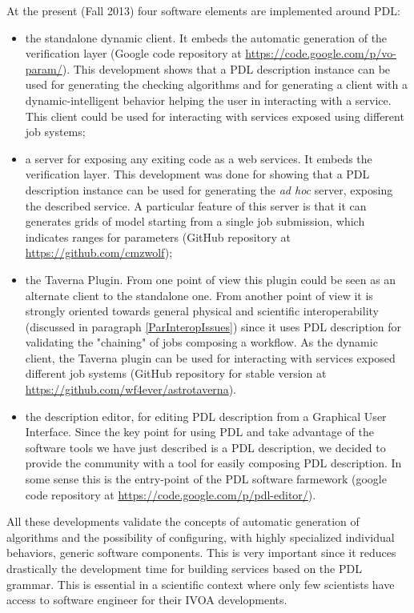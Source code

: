 \documentclass[a4paper,11pt] {ivoa}
\begin{document}
At the present (Fall 2013) four software elements are implemented around PDL:
\begin{itemize}
\item the standalone dynamic client. It embeds the automatic generation of the verification layer (Google code repository at \url{https://code.google.com/p/vo-param/}). This development shows that a PDL description instance can be used for generating the checking algorithms and for generating a client with a dynamic-intelligent behavior helping the user in interacting with a service. This client could be used for interacting with services exposed using different job systems;
\item a server for exposing any exiting code as a web services. It embeds the verification layer. This development was done for showing that a PDL description instance can be used for generating the {\it ad hoc} server, exposing the described service. A particular feature of this server is that it can generates grids of model starting from a single job submission, which indicates ranges for parameters (GitHub repository at \url{https://github.com/cmzwolf});
\item the Taverna Plugin. From one point of view this plugin could be seen as an alternate client to the standalone one. From another point of view it is strongly oriented towards general physical and scientific interoperability (discussed in paragraph \ref{ParInteropIssues}) since it uses PDL description for validating the "chaining" of jobs composing a workflow. As the dynamic client, the Taverna plugin can be used for interacting with services exposed different job systems (GitHub repository for stable version at \url{https://github.com/wf4ever/astrotaverna}).  
\item the description editor, for editing PDL description from a Graphical User Interface. Since the key point for using PDL and take advantage of the software tools we have just described is a PDL description, we decided to provide the community with a tool for easily composing PDL description. In some sense this is the entry-point of the PDL software farmework  (google code repository at \url{https://code.google.com/p/pdl-editor/}).
\end{itemize}
All these developments validate the concepts of automatic generation of algorithms and the possibility of configuring, with highly specialized individual behaviors, generic software components. This is very important since it reduces drastically the development time for building services based on the PDL grammar. This is essential in a scientific context where only few scientists have access to software engineer for their IVOA developments.\\
\end{document}
